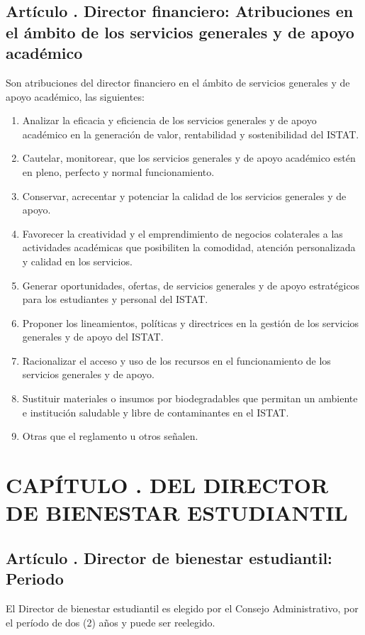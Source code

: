 \subsection{Artículo . Director financiero: Atribuciones en el ámbito de los servicios generales y de apoyo académico}
\addtocounter{ns}{1}
Son atribuciones del director financiero en el ámbito de servicios generales y de apoyo académico, las siguientes: 
\begin{enumerate}
\item Analizar la eficacia y eficiencia de los servicios generales y de apoyo académico en la generación de valor, rentabilidad y sostenibilidad del ISTAT. 
\item Cautelar, monitorear, que los servicios generales y de apoyo académico estén en pleno, perfecto y normal funcionamiento. 
\item Conservar, acrecentar y potenciar la calidad de los servicios generales y de apoyo. 
\item Favorecer la creatividad y el emprendimiento de negocios colaterales a las actividades académicas que posibiliten la comodidad, atención personalizada y calidad en los servicios. 
\item Generar oportunidades, ofertas, de servicios generales y de apoyo estratégicos para los estudiantes y personal del ISTAT. 
\item Proponer los lineamientos, políticas y directrices en la gestión de los servicios generales y de apoyo del ISTAT. 
\item Racionalizar el acceso y uso de los recursos en el funcionamiento de los servicios generales y de apoyo. 
\item Sustituir materiales o insumos por biodegradables que permitan un ambiente e institución saludable y libre de contaminantes en el ISTAT. 
\item Otras que el reglamento u otros señalen. 
\end{enumerate}
\section{CAPÍTULO . DEL DIRECTOR DE BIENESTAR ESTUDIANTIL}
\setcounter{re}{1}
\subsection{Artículo . Director de bienestar estudiantil: Periodo}
\addtocounter{ns}{1}
El Director de bienestar estudiantil es elegido por el Consejo Administrativo, por el período de dos (2) años y puede ser reelegido.
